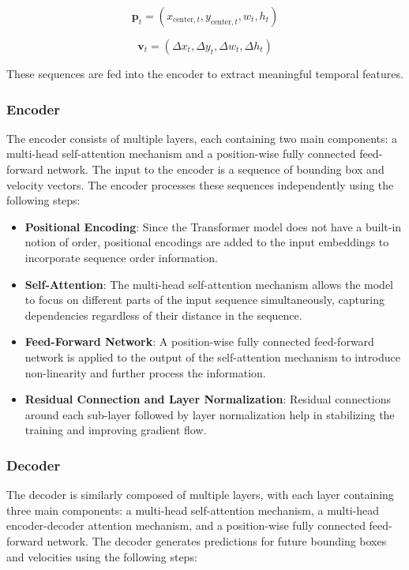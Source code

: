 \documentclass[12pt,oneside]{book} %
\begin{document}
\begin{equation}
    \mathbf{p}_t = (x_{\text{center}, t}, y_{\text{center}, t}, w_t, h_t)
\end{equation}

\begin{equation}
    \mathbf{v}_t = (\Delta x_t, \Delta y_t, \Delta w_t, \Delta h_t)
\end{equation}

These sequences are fed into the encoder to extract meaningful temporal
features.

\subsubsection{Encoder}

The encoder consists of multiple layers, each containing two main components: a
multi-head self-attention mechanism and a position-wise fully connected
feed-forward network. The input to the encoder is a sequence of bounding box
and velocity vectors. The encoder processes these sequences independently using
the following steps:

\begin{itemize}
    \item \textbf{Positional Encoding}: Since the Transformer model does not have a built-in notion of order, positional encodings are added to the input embeddings to incorporate sequence order information.
    \item \textbf{Self-Attention}: The multi-head self-attention mechanism allows the model to focus on different parts of the input sequence simultaneously, capturing dependencies regardless of their distance in the sequence.
    \item \textbf{Feed-Forward Network}: A position-wise fully connected feed-forward network is applied to the output of the self-attention mechanism to introduce non-linearity and further process the information.
    \item \textbf{Residual Connection and Layer Normalization}: Residual connections around each sub-layer followed by layer normalization help in stabilizing the training and improving gradient flow.
\end{itemize}

\subsubsection{Decoder}

The decoder is similarly composed of multiple layers, with each layer
containing three main components: a multi-head self-attention mechanism, a
multi-head encoder-decoder attention mechanism, and a position-wise fully
connected feed-forward network. The decoder generates predictions for future
bounding boxes and velocities using the following steps:
\end{document}
